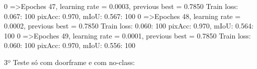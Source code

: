   0%
=>Epoches 47, learning rate = 0.0003,                 previous best = 0.7850
Train loss: 0.067: 100%
pixAcc: 0.970, mIoU: 0.567: 100%
  0%
=>Epoches 48, learning rate = 0.0002,                 previous best = 0.7850
Train loss: 0.060: 100%
pixAcc: 0.970, mIoU: 0.564: 100%
  0%
=>Epoches 49, learning rate = 0.0001,                 previous best = 0.7850
Train loss: 0.060: 100%
pixAcc: 0.970, mIoU: 0.556: 100%










\bigskip










3º Teste só com doorframe e com no-class:

